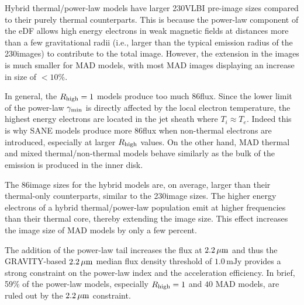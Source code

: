 
Hybrid thermal/power-law models have larger 230\GHz VLBI pre-image sizes compared to their purely thermal counterparts.
This is because the power-law component of the eDF allows high energy electrons in weak magnetic fields at distances more than a few gravitational radii (i.e., larger than the typical emission radius of the 230\GHz images) to contribute to the total image.
However, the extension in the images is much smaller for MAD models, with most MAD images displaying an increase in size of $<10\%$.


In general, the $R_{\rm high}=1$ models produce too much 86\GHz flux.
Since the lower limit of the power-law $\gamma_{\rm min}$ is directly affected by the local electron temperature, the highest energy electrons are located in the jet sheath where $T_i \approx T_e$.
Indeed this is why SANE models produce more 86\GHz flux when non-thermal electrons are introduced, especially at larger $R_\mathrm{high}$ values.
On the other hand, MAD thermal and mixed thermal/non-thermal models behave similarly as the bulk of the emission is produced in the inner disk.

The 86\GHz image sizes for the hybrid \hamr models are, on average, larger than their thermal-only counterparts, similar to the 230\GHz image sizes.
The higher energy electrons of a hybrid thermal/power-law population emit at higher frequencies than their thermal core, thereby extending the image size.
This effect increases the image size of MAD models by only a few percent.


The addition of the power-law tail increases the flux at $2.2\,\mu\mathrm{m}$ and thus the GRAVITY-based $2.2\,\mu\mathrm{m}$ median flux density threshold of $1.0\,\mathrm{mJy}$ provides a strong constraint on the power-law index and the acceleration efficiency.
In brief, 59\% of the power-law models, especially $R_\mathrm{high}=1$ and $40$ MAD models, are ruled out by the $2.2\,\mu\mathrm{m}$ constraint.


